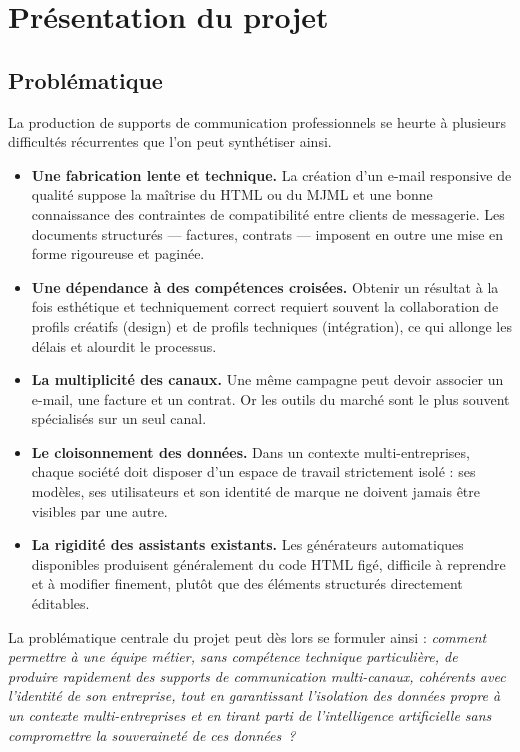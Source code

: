 \documentclass[12pt,a4paper,oneside]{report}
\begin{document}
\section{Présentation du projet}

\subsection{Problématique}
La production de supports de communication professionnels se heurte à
plusieurs difficultés récurrentes que l'on peut synthétiser ainsi.

\begin{itemize}[leftmargin=1.4cm]
  \item \textbf{Une fabrication lente et technique.} La création d'un
  e-mail responsive de qualité suppose la maîtrise du HTML ou du MJML et
  une bonne connaissance des contraintes de compatibilité entre clients de
  messagerie. Les documents structurés — factures, contrats — imposent en
  outre une mise en forme rigoureuse et paginée.

  \item \textbf{Une dépendance à des compétences croisées.} Obtenir un
  résultat à la fois esthétique et techniquement correct requiert souvent
  la collaboration de profils créatifs (design) et de profils techniques
  (intégration), ce qui allonge les délais et alourdit le processus.

  \item \textbf{La multiplicité des canaux.} Une même campagne peut devoir
  associer un e-mail, une facture et un contrat. Or les outils du marché
  sont le plus souvent spécialisés sur un seul canal.

  \item \textbf{Le cloisonnement des données.} Dans un contexte
  multi-entreprises, chaque société doit disposer d'un espace de travail
  strictement isolé : ses modèles, ses utilisateurs et son identité de
  marque ne doivent jamais être visibles par une autre.

  \item \textbf{La rigidité des assistants existants.} Les générateurs
  automatiques disponibles produisent généralement du code HTML figé,
  difficile à reprendre et à modifier finement, plutôt que des éléments
  structurés directement éditables.
\end{itemize}

La problématique centrale du projet peut dès lors se formuler ainsi :
\emph{comment permettre à une équipe métier, sans compétence technique
particulière, de produire rapidement des supports de communication
multi-canaux, cohérents avec l'identité de son entreprise, tout en
garantissant l'isolation des données propre à un contexte
multi-entreprises et en tirant parti de l'intelligence artificielle sans
compromettre la souveraineté de ces données~?}
\end{document}
